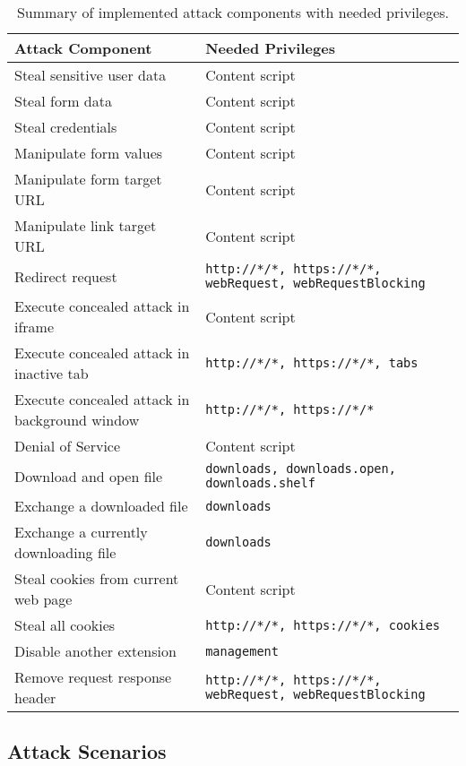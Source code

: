 	\begin{table}[h]
		\begin{tabular}{|l|l|} \hline 
			\textbf{Attack Component} & \textbf{Needed Privileges} \\ \hline
			Steal sensitive user data & Content script \\ \hline
			Steal form data & Content script \\ \hline
			Steal credentials & Content script \\ \hline
			Manipulate form values & Content script \\ \hline
			Manipulate form target URL & Content script \\ \hline
			Manipulate link target URL & Content script \\ \hline
			Redirect request & \texttt{http://*/*, https://*/*, webRequest, webRequestBlocking} \\ \hline
			Execute concealed attack in iframe & Content script \\ \hline
			Execute concealed attack in inactive tab & \texttt{http://*/*, https://*/*, tabs} \\ \hline
			Execute concealed attack in background window & \texttt{http://*/*, https://*/*} \\ \hline
			Denial of Service & Content script \\ \hline
			Download and open file & \texttt{downloads, downloads.open, downloads.shelf} \\ \hline
			Exchange a downloaded file & \texttt{downloads} \\ \hline
			Exchange a currently downloading file & \texttt{downloads} \\ \hline
			Steal cookies from current web page & Content script \\ \hline
			Steal all cookies & \texttt{http://*/*, https://*/*, cookies} \\ \hline
			Disable another extension & \texttt{management} \\ \hline
			Remove request response header & \texttt{http://*/*, https://*/*, webRequest, webRequestBlocking} \\ \hline
		\end{tabular}
		\caption{Summary of implemented attack components with needed privileges.}
		\label{tab:summaryAttacks}
	\end{table}
	
\subsection{Attack Scenarios}

